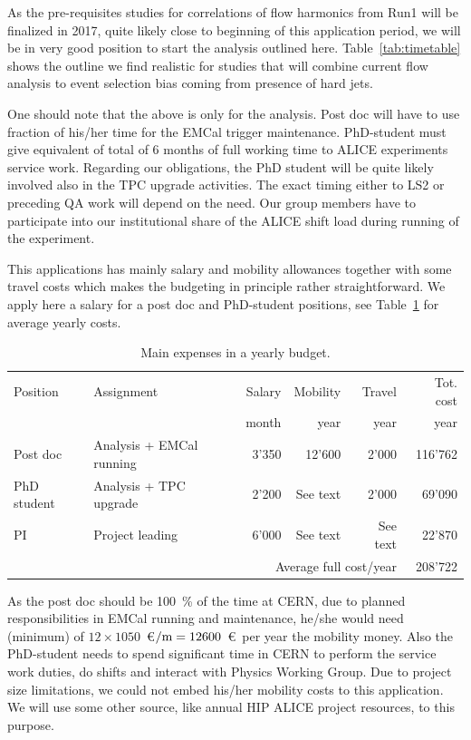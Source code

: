 As the pre-requisites studies for correlations of flow harmonics from Run1 will be finalized in 2017, quite likely close to beginning of this application period, we will be in very good position to start the analysis outlined here. Table~\ref{tab:timetable} shows the outline we find realistic for studies that will combine current flow analysis to event selection bias coming from presence of hard jets.

One should note that the above is only for the analysis. Post doc will have to use fraction of his/her time for the EMCal trigger maintenance. PhD-student must give equivalent of total of 6 months of full working time to ALICE experiments service work. Regarding our obligations, the PhD student will be quite likely involved also in the TPC upgrade activities. The exact timing either to LS2 or preceding QA work will depend on the need. Our group members have to participate into our institutional share of the ALICE shift load during running of the experiment.

This applications has mainly salary and mobility allowances together with some travel costs which makes the budgeting in principle rather straightforward. We apply here a salary for a post doc and PhD-student positions, see Table~\ref{tab:money} for average yearly costs.
\begin{table}[htp]
\caption{Main expenses in a yearly budget.}
\begin{center}
\begin{tabular}{l|l|r|r|r|r}
Position & Assignment & Salary & Mobility & Travel & Tot. cost\\
& & month & year & year & year \\\hline
Post doc & Analysis + EMCal running    & 3'350 & 12'600 & 2'000 & 116'762\\
PhD student & Analysis + TPC upgrade & 2'200 &  See text   & 2'000 & 69'090 \\
PI & Project leading & 6'000 &  See text   & See text & 22'870 \\
\multicolumn{5}{r}{Average full cost/year} & 208'722  \\
\end{tabular}
\end{center}
\label{tab:money}
\end{table}
As the post doc should be 100~\% of the time at CERN, due to planned responsibilities in EMCal running and maintenance, he/she would need (minimum) of $12\times1050$~\euro$/{\rm m}=12600$~\euro\ per year the mobility money. Also the PhD-student needs to spend significant time in CERN to perform the service work duties, do shifts and interact with Physics Working Group. Due to project size limitations, we could not embed his/her mobility costs to this application. We will use some other source, like annual HIP ALICE project resources, to this purpose.

